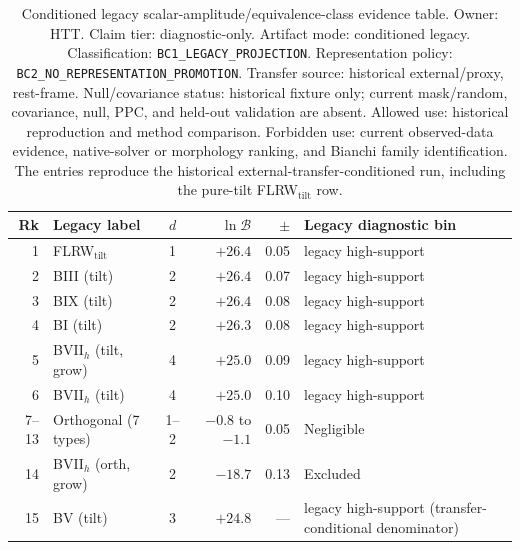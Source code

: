\begin{table}[t]
\centering
\caption{Conditioned legacy scalar-amplitude/equivalence-class evidence
table.  Owner: HTT.  Claim tier: diagnostic-only.  Artifact mode:
conditioned legacy.  Classification:
\texttt{BC1\_LEGACY\_PROJECTION}.  Representation policy:
\texttt{BC2\_NO\_REPRESENTATION\_PROMOTION}.  Transfer source:
historical external/proxy,
rest-frame.  Null/covariance status: historical fixture only; current
mask/random, covariance, null, PPC, and held-out validation are absent.
Allowed use: historical reproduction and method comparison.  Forbidden
use: current observed-data evidence, native-solver or morphology ranking,
and Bianchi family identification.  The entries reproduce the historical
external-transfer-conditioned run, including the pure-tilt
FLRW$_{\mathrm{tilt}}$ row.}
\label{tab:evidence-grand}
\footnotesize
\begin{tabular}{rlcrrl}
\toprule
Rk & Legacy label & $d$ & $\ln\mathcal{B}$ & $\pm$ & Legacy diagnostic bin \\
\midrule
1 & FLRW$_{\mathrm{tilt}}$ & 1 & $+26.4$ & 0.05 & legacy high-support \\
2 & BIII (tilt) & 2 & $+26.4$ & 0.07 & legacy high-support \\
3 & BIX (tilt) & 2 & $+26.4$ & 0.08 & legacy high-support \\
4 & BI (tilt) & 2 & $+26.3$ & 0.08 & legacy high-support \\
5 & BVII$_h$ (tilt, grow) & 4 & $+25.0$ & 0.09 & legacy high-support \\
6 & BVII$_h$ (tilt) & 4 & $+25.0$ & 0.10 & legacy high-support \\
\midrule
7--13 & Orthogonal (7 types) & 1--2 & $-0.8$ to $-1.1$ & 0.05 & Negligible \\
\midrule
14 & BVII$_h$ (orth, grow) & 2 & $-18.7$ & 0.13 & Excluded \\
15 & BV (tilt) & 3 & $+24.8$ & --- & legacy high-support (transfer-conditional denominator) \\
\bottomrule
\end{tabular}
\end{table}

